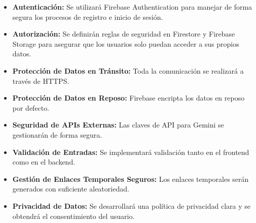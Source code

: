 \documentclass[12pt,a4paper]{report}
\begin{document}
\begin{itemize}
\item \textbf{Autenticación:} Se utilizará Firebase Authentication para manejar de forma segura los procesos de registro e inicio de sesión.

\item \textbf{Autorización:} Se definirán reglas de seguridad en Firestore y Firebase Storage para asegurar que los usuarios solo puedan acceder a sus propios datos.

\item \textbf{Protección de Datos en Tránsito:} Toda la comunicación se realizará a través de HTTPS.

\item \textbf{Protección de Datos en Reposo:} Firebase encripta los datos en reposo por defecto.

\item \textbf{Seguridad de APIs Externas:} Las claves de API para Gemini se gestionarán de forma segura.

\item \textbf{Validación de Entradas:} Se implementará validación tanto en el frontend como en el backend.

\item \textbf{Gestión de Enlaces Temporales Seguros:} Los enlaces temporales serán generados con suficiente aleatoriedad.

\item \textbf{Privacidad de Datos:} Se desarrollará una política de privacidad clara y se obtendrá el consentimiento del usuario.
\end{itemize}
\end{document}
